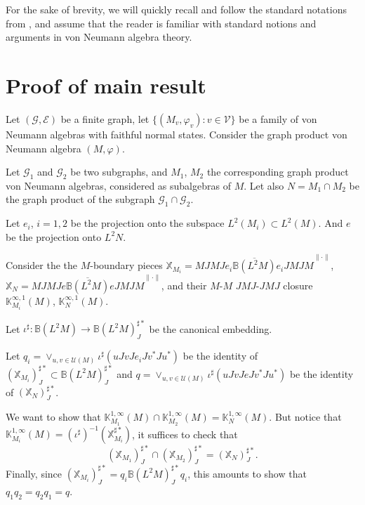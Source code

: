 \documentclass[a4paper, 11pt, reqno]{amsart}
\numberwithin{equation}{section}
\theoremstyle{plain}
\theoremstyle{remark}
\theoremstyle{definition}
\newcommand{\KKK}{{\mathbb K}}
\newcommand{\BB}{{\mathbb{ B}}}
\newcommand{\XX}{{\mathbb{ X}}}
\newcommand{\VV}{{\mathcal V}}
\newcommand{\EE}{{\mathcal E}}
\newcommand{\GG}{{\mathcal G}}
\begin{document}
 For the sake of brevity, we will quickly recall and follow the standard notations from \cite{DKEP23}, and assume that the reader is familiar with standard notions and arguments in von Neumann algebra theory.



\section{Proof of main result}
Let $ (\GG,\EE) $ be a finite graph, let $ \{( M_v,\varphi_v ):v\in \VV\} $ be a family of von Neumann algebras with faithful normal states. Consider the graph product von Neumann algebra $(M,\varphi)$.

Let $ \GG_1 $ and $\GG_2$ be two subgraphs, and $M_1$, $M_2$ the corresponding graph product von Neumann algebras, considered as subalgebras of $M$. Let also $N = M_1\cap M_2$ be the graph product of the subgraph $\GG_1\cap \GG_2$. 

Let $e_i$, $i=1,2$ be the projection onto the subspace $L^2(M_i) \subset L^2(M)$. And $e$ be the projection onto $L^2N$.

Consider the the $M$-boundary pieces $ \XX_{M_i} = \overline{  MJMJe_i\BB(L^2M)e_i JMJM}^{\|\cdot \|} $, $  \XX_{N} = \overline{  MJMJe\BB(L^2M)e JMJM}^{\|\cdot \|} $, and their $M$-$M$ $JMJ$-$JMJ$ closure $ \KKK^{\infty,1}_{M_i}(M) $, $\KKK_{N}^{\infty,1}(M)$.

Let $ \iota^\sharp: \BB(L^2M) \to \BB(L^2M)^{\sharp*}_J $ be the canonical embedding.

Let $ q_i = \vee_{u,v\in \mathcal{U}(M)} \iota^{\sharp}(uJvJe_iJv^*Ju^*)$ be the identity of $ (\XX_{M_i})_J^{\sharp*} \subset \BB(L^2M)^{\sharp*}_J$ and $q= \vee_{u,v\in \mathcal{U}(M)} \iota^{\sharp}(uJvJeJv^*Ju^*)$ be the identity of $ (\XX_{N})_J^{\sharp*} $.

We want to show that $\KKK^{1,\infty}_{M_1}(M)\cap \KKK^{1,\infty}_{M_2}(M) = \KKK^{1,\infty}_{N}(M)  $. But notice that $ \KKK^{1,\infty}_{M_i}(M) = (\iota^{\sharp})^{-1}\left( \XX_{M_i}^{\sharp*}  \right) $, it suffices to check that
$$ (\XX_{M_1})_J^{\sharp*}\cap (\XX_{M_2})_J^{\sharp*} = (\XX_{N})_J^{\sharp*}.$$
Finally, since $ (\XX_{M_i})_J^{\sharp*} = q_i \BB(L^2M)^{\sharp *}_Jq_i $, this amounts to show that $ q_1q_2=q_2q_1=q $.
\end{document}

